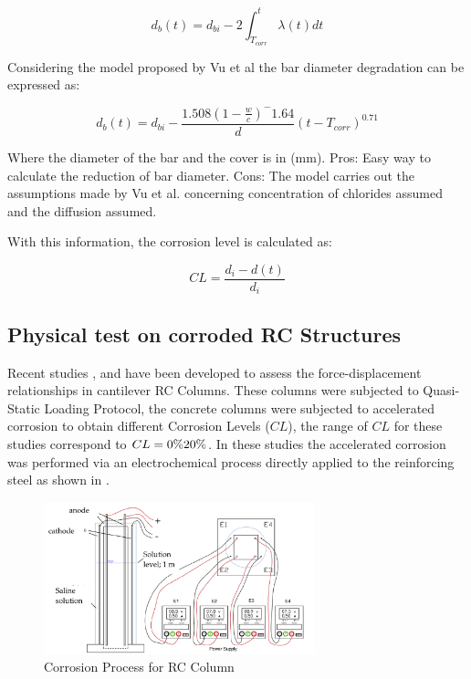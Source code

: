 \begin{equation}
	d_{b}(t)=d_{bi}-2\int_{T_{corr}}^{t} \lambda(t) dt
\end{equation}

Considering the model proposed by Vu et al the bar diameter degradation can be expressed as:

\begin{equation}
	d_{b}(t)=d_{bi}-\frac{1.508(1-\frac{w}{c})^-1.64}{d}(t-T_{corr})^0.71
\end{equation}

Where the diameter of the bar and the cover is in (mm).
Pros:
Easy way to calculate the reduction of bar diameter.
Cons:
The model carries out the assumptions made by Vu et al. concerning concentration of chlorides assumed and the diffusion assumed.

With this information, the corrosion level is calculated as:

\begin{equation}
	CL=\frac{d_{i}-d(t)}{d_{i}}
\end{equation}

\subsection{Physical test on corroded RC Structures}


Recent studies \cite{Ma2012}, \cite{Meda2014} and \cite{Yang2016} have been developed to assess the force-displacement relationships in cantilever RC Columns. These columns were subjected to Quasi-Static Loading Protocol, the concrete columns were subjected to accelerated corrosion to obtain different Corrosion Levels ($CL$), the range of $CL$ for these studies correspond to $CL=0\%\-20\%$. In these studies the accelerated corrosion was performed via an electrochemical process directly applied to the reinforcing steel as shown in .

\begin{figure}[htbp]
	\centering
	\includegraphics[width=0.7\textwidth]{Chapter-4/figs/Meda_Corrosion}
	\caption{Corrosion Process for RC Column \cite{Meda2014}}
	\label{fig:Meda_RC_CorrosionProc}
\end{figure}

